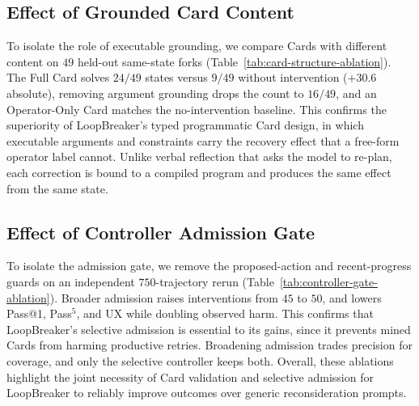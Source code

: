 \documentclass[letterpaper]{article}
\begin{document}
\subsection*{Effect of Grounded Card Content}

To isolate the role of executable grounding, we compare Cards with different content on $49$ held-out same-state forks (Table~\ref{tab:card-structure-ablation}). The Full Card solves $24/49$ states versus $9/49$ without intervention ($+30.6$ absolute), removing argument grounding drops the count to $16/49$, and an Operator-Only Card matches the no-intervention baseline. This confirms the superiority of LoopBreaker's typed programmatic Card design, in which executable arguments and constraints carry the recovery effect that a free-form operator label cannot. Unlike verbal reflection that asks the model to re-plan, each correction is bound to a compiled program and produces the same effect from the same state.

\begin{table}[t]
\centering
\small
\setlength{\tabcolsep}{2pt}
\renewcommand{\arraystretch}{1.05}
\renewcommand{\arraystretch}{1.0}
\caption{Same-state Card-content ablation on $49$ held-out pre-action states. $\Delta$ and diagnostics are relative to No Intervention. Bold marks the best value.}
\label{tab:card-structure-ablation}
\end{table}

\subsection*{Effect of Controller Admission Gate}

To isolate the admission gate, we remove the proposed-action and recent-progress guards on an independent $750$-trajectory rerun (Table~\ref{tab:controller-gate-ablation}). Broader admission raises interventions from $45$ to $50$, and lowers Pass@1, Pass$^5$, and UX while doubling observed harm. This confirms that LoopBreaker's selective admission is essential to its gains, since it prevents mined Cards from harming productive retries. Broadening admission trades precision for coverage, and only the selective controller keeps both. Overall, these ablations highlight the joint necessity of Card validation and selective admission for LoopBreaker to reliably improve outcomes over generic reconsideration prompts.
\end{document}
